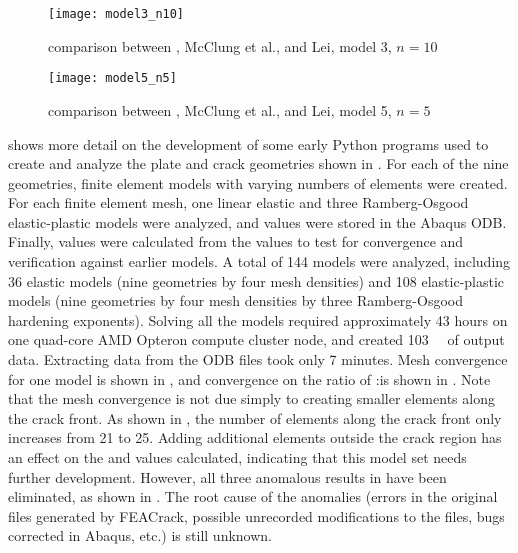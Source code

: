 \begin{figure}[tbp]
  \centering
  \texttt{[image: model3\_n10]}
  \caption[\hone comparison between \citeauthor{quillen2005}, McClung et al., and Lei, model 3, \(n=10\)]{\hone comparison between \citet{quillen2005}, McClung et al., and Lei, model 3, \(n=10\) \label{fig:model3_n10_2005}}
\end{figure}
\begin{figure}
  \centering
  \texttt{[image: model5\_n5]}
  \caption[\hone comparison between \citeauthor{quillen2005}, McClung et al., and Lei, model 5, \(n=5\)]{\hone comparison between \citet{quillen2005}, McClung et al., and Lei, model 5, \(n=5\) \label{fig:model5_n5_2005}}
\end{figure}

 shows more detail on the development of some early Python programs used to create and analyze the plate and crack geometries shown in .
For each of the nine geometries, finite element models with varying numbers of elements were created.
For each finite element mesh, one linear elastic and three Ramberg-Osgood elastic-plastic models were analyzed, and \J values were stored in the Abaqus ODB.
Finally, \hone values were calculated from the \J values to test for convergence and verification against earlier models.
A total of 144 models were analyzed, including 36 elastic models (nine geometries by four mesh densities) and 108 elastic-plastic models (nine geometries by four mesh densities by three Ramberg-Osgood hardening exponents).
Solving all the models required approximately 43 hours on one quad-core AMD Opteron compute cluster node, and created \SI{103}{\giga\byte} of output data. Extracting \hone data from the ODB files took only 7 minutes.
Mesh convergence for one model is shown in , and convergence on the ratio of \Jpl:\Jel is shown in .
Note that the mesh convergence is not due simply to creating smaller elements along the crack front.
As shown in , the number of elements along the crack front only increases from 21 to 25.
Adding additional elements outside the crack region has an effect on the \J and \hone values calculated, indicating that this model set needs further development.
However, all three anomalous \hone results in \citet{quillen2005} have been eliminated, as shown in .
The root cause of the anomalies (errors in the original files generated by FEACrack, possible unrecorded modifications to the files, bugs corrected in Abaqus, etc.) is still unknown.

